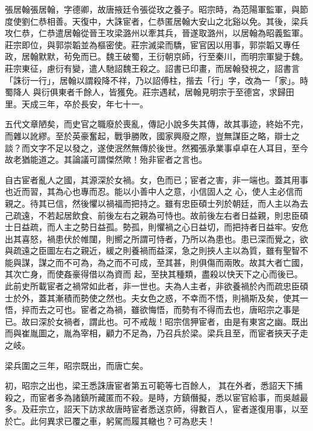\begin{pinyinscope}
 張居翰張居翰，字德卿，故唐掖廷令張從玫之養子。昭宗時，為范陽軍監軍，與節度使劉仁恭相善。天復中，大誅宦者，仁恭匿居翰大安山之北谿以免。其後，梁兵攻仁恭，仁恭遣居翰從晉王攻梁潞州以牽其兵，晉遂取潞州，以居翰為昭義監軍。莊宗即位，與郭崇韜並為樞密使。莊宗滅梁而驕，宦官因以用事，郭崇韜又專任政，居翰默默，茍免而已。魏王破蜀，王衍朝京師，行至秦川，而明宗軍變于魏。莊宗東征，慮衍有變，遣人馳詔魏王殺之。詔書已印畫，而居翰發視之，詔書言「誅衍一行」，居翰以謂殺降不祥，乃以詔傅柱，揩去「行」字，改為一「家」。時蜀降人
 與衍俱東者千餘人，皆獲免。莊宗遇弒，居翰見明宗于至德宮，求歸田里。天成三年，卒於長安，年七十一。



 五代文章陋矣，而史官之職廢於喪亂，傳記小說多失其傳，故其事迹，終始不完，而雜以訛繆。至於英豪奮起，戰爭勝敗，國家興廢之際，豈無謀臣之略，辯士之談？而文字不足以發之，遂使泯然無傳於後世。然獨張承業事卓卓在人耳目，至今故老猶能道之。其論議可謂傑然歟！殆非宦者之言也。



 自古宦者亂人之國，其源深於女禍。女，色而已；宦者之害，非一端也。蓋其用事也近而習，其為心也專而忍。能以小善中人之意，小信固人之
 心，使人主必信而親之。待其已信，然後懼以禍福而把持之。雖有忠臣碩士列於朝廷，而人主以為去己疏遠，不若起居飲食、前後左右之親為可恃也。故前後左右者日益親，則忠臣碩士日益疏，而人主之勢日益孤。勢孤，則懼禍之心日益切，而把持者日益牢。安危出其喜怒，禍患伏於帷闥，則嚮之所謂可恃者，乃所以為患也。患已深而覺之，欲與疏遠之臣圖左右之親近，緩之則養禍而益深，急之則挾人主以為質，雖有聖智不能與謀，謀之而不可為，為之而不可成，至其甚，則俱傷而兩敗。故其大者亡國，其次亡身，而使姦豪得借以為資而
 起，至抉其種類，盡殺以快天下之心而後已。此前史所載宦者之禍常如此者，非一世也。夫為人主者，非欲養禍於內而疏忠臣碩士於外，蓋其漸積而勢使之然也。夫女色之惑，不幸而不悟，則禍斯及矣，使其一悟，捽而去之可也。宦者之為禍，雖欲悔悟，而勢有不得而去也，唐昭宗之事是已。故曰深於女禍者，謂此也。可不戒哉！昭宗信狎宦者，由是有東宮之幽。既出而與崔胤圖之，胤為宰相，顧力不足為，乃召兵於梁。梁兵且至，而宦者挾天子走之岐。



 梁兵圍之三年，昭宗既出，而唐亡矣。



 初，昭宗之出也，梁王悉誅唐宦者第五可範等七百餘人，
 其在外者，悉詔天下捕殺之，而宦者多為諸鎮所藏匿而不殺。是時，方鎮僭擬，悉以宦官給事，而吳越最多。及莊宗立，詔天下訪求故唐時宦者悉送京師，得數百人，宦者遂復用事，以至於亡。此何異求已覆之車，躬駕而履其轍也？可為悲夫！




\end{pinyinscope}
